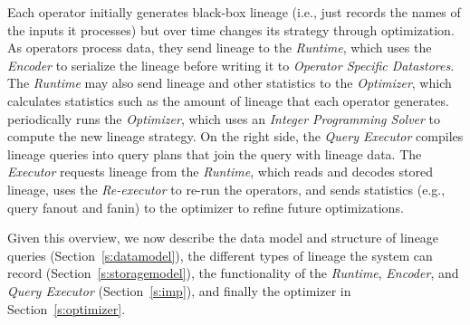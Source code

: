 Each
operator initially generates black-box lineage (i.e., just records the names of the inputs it processes) but over time
changes its strategy through optimization.  As operators 
process data, they send lineage to the {\it
  Runtime}, which uses
the {\it Encoder} to serialize the lineage before writing it to
{\it Operator Specific Datastores}.  The {\it Runtime} may also send
lineage and other statistics to the {\it Optimizer}, which
calculates  statistics such as the amount of
lineage that each operator generates.  \sys{} periodically runs the
{\it Optimizer}, which uses an {\it Integer Programming Solver} to compute
the new lineage strategy.  On the right side, the {\it Query
  Executor} compiles lineage queries into query plans that join the
query with lineage data.  The {\it Executor} requests lineage
from the {\it Runtime}, which  reads and decodes  stored
lineage, uses the {\it Re-executor} to re-run the operators, and
 sends statistics (e.g., query fanout and
fanin) to the optimizer to refine future optimizations.

Given this  overview, we now describe the data model and structure of lineage
queries (Section~\ref{s:datamodel}), the different types of lineage the system
can record (Section~\ref{s:storagemodel}), the functionality of the {\it
Runtime}, {\it Encoder}, and {\it Query Executor} (Section~\ref{s:imp}), and finally
the optimizer in Section~\ref{s:optimizer}. 

